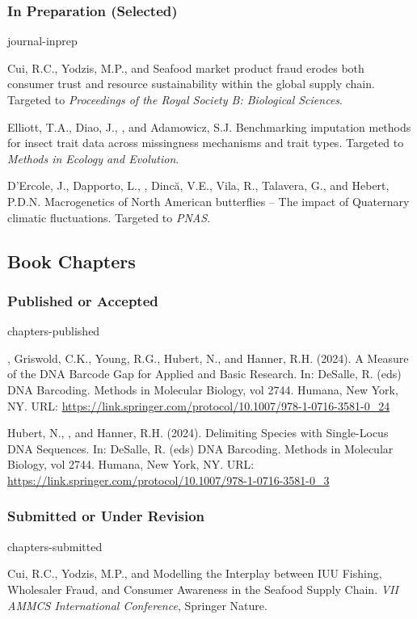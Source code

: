 \subsubsection{In Preparation (Selected)}
\begin{revlist}[itemsep=0.45\baselineskip]{journal-inprep}
\item \dsup Cui, R.C., Yodzis, M.P., and \me Seafood market product fraud erodes
  both consumer trust and resource sustainability within the global supply chain.
  Targeted to \textit{Proceedings of the Royal Society B: Biological Sciences}.
\item Elliott, T.A., Diao, J., \me, and Adamowicz, S.J. Benchmarking imputation
  methods for insect trait data across missingness mechanisms and trait types.
  Targeted to \textit{Methods in Ecology and Evolution}.
\item D'Ercole, J., Dapporto, L., \me, Dincă, V.E., Vila, R., Talavera, G., and
  Hebert, P.D.N. Macrogenetics of North American butterflies -- The impact of
  Quaternary climatic fluctuations. Targeted to \textit{PNAS}.
\end{revlist}

\subsection{Book Chapters}
\subsubsection{Published or Accepted}
\begin{revlist}[itemsep=0.45\baselineskip]{chapters-published}
\item \me, Griswold, C.K., Young, R.G., Hubert, N., and Hanner, R.H. (2024). A
  Measure of the DNA Barcode Gap for Applied and Basic Research. In: DeSalle, R.
  (eds) DNA Barcoding. Methods in Molecular Biology, vol 2744. Humana, New York,
  NY. URL: \url{https://link.springer.com/protocol/10.1007/978-1-0716-3581-0_24}
\item Hubert, N., \me, and Hanner, R.H. (2024). Delimiting Species with
  Single-Locus DNA Sequences. In: DeSalle, R. (eds) DNA Barcoding. Methods in
  Molecular Biology, vol 2744. Humana, New York, NY. URL:
  \url{https://link.springer.com/protocol/10.1007/978-1-0716-3581-0_3}
\end{revlist}

\subsubsection{Submitted or Under Revision}
\begin{revlist}{chapters-submitted}
\item \dsup Cui, R.C., Yodzis, M.P., and \me Modelling the Interplay between IUU
  Fishing, Wholesaler Fraud, and Consumer Awareness in the Seafood Supply Chain.
  \textit{VII AMMCS International Conference}, Springer Nature.
\end{revlist}

